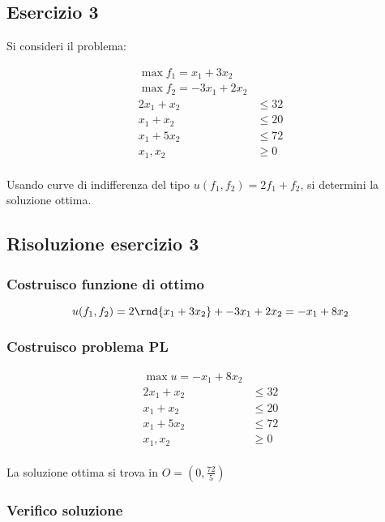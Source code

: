 \documentclass[\main/main.tex]{subfiles}
\begin{document}
\subsection{Esercizio 3}
Si consideri il problema:

\begin{align*}
  \max f_1 = x_1 + 3x_2  \\
  \max f_2 = -3x_1 +2x_2 \\
  2x_1 + x_2 & \leq 32   \\
  x_1 + x_2  & \leq 20   \\
  x_1 + 5x_2 & \leq 72   \\
  x_1, x_2   & \geq 0    \\
\end{align*}

Usando curve di indifferenza del tipo $u (f_1, f_2) = 2f_1 + f_2$, si determini la soluzione ottima.

\subsection{Risoluzione esercizio 3}

\subsubsection*{Costruisco funzione di ottimo}

\[
  u (f_1, f_2) = 2\rnd{x_1 + 3x_2} + -3x_1 +2x_2 = -x_1 + 8x_2
\]

\subsubsection*{Costruisco problema PL}

\begin{align*}
  \max u = -x_1 + 8x_2 \\
  2x_1 + x_2 & \leq 32 \\
  x_1 + x_2  & \leq 20 \\
  x_1 + 5x_2 & \leq 72 \\
  x_1, x_2   & \geq 0  \\
\end{align*}

La soluzione ottima si trova in $O = (0, \frac{72}{5})$

\subsubsection*{Verifico soluzione}
\end{document}
